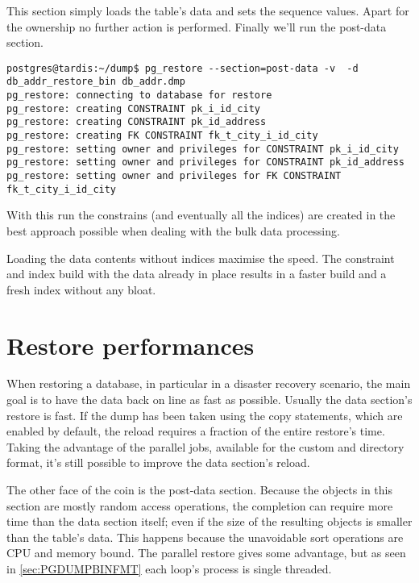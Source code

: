 This section simply loads the table's data and sets the sequence values. Apart for the ownership no 
further action is performed. Finally we'll run the post-data section.

\begin{verbatim}
postgres@tardis:~/dump$ pg_restore --section=post-data -v  -d db_addr_restore_bin db_addr.dmp 
pg_restore: connecting to database for restore
pg_restore: creating CONSTRAINT pk_i_id_city
pg_restore: creating CONSTRAINT pk_id_address
pg_restore: creating FK CONSTRAINT fk_t_city_i_id_city
pg_restore: setting owner and privileges for CONSTRAINT pk_i_id_city
pg_restore: setting owner and privileges for CONSTRAINT pk_id_address
pg_restore: setting owner and privileges for FK CONSTRAINT fk_t_city_i_id_city

\end{verbatim}

With this run the constrains (and eventually all the indices) are created in the best 
approach possible when dealing with the bulk data processing. \newline

Loading the data contents without indices maximise the speed. The constraint and index build with 
the data already in place results in a faster build and a fresh index without any bloat.

\section{Restore performances}

When restoring a database, in particular in a disaster recovery scenario, the main goal is 
to have the data back on line as fast as possible. Usually the data section's restore 
is fast. If the dump has been taken using the copy statements, which are enabled by default, 
the reload requires a fraction of the entire restore's time. Taking the advantage of the parallel 
jobs, available for the custom and directory format, it's still possible to improve the data 
section's reload.\newline

The other face of the coin is the post-data section. Because the objects in this section are mostly 
random access operations, the completion can require more time than the data section itself; even 
if the size of the resulting objects is smaller than the table's data. This happens because the 
unavoidable sort operations are CPU and memory bound. The parallel restore gives some advantage, 
but as seen in \ref{sec:PGDUMPBINFMT} each loop's process is single threaded. \newline

